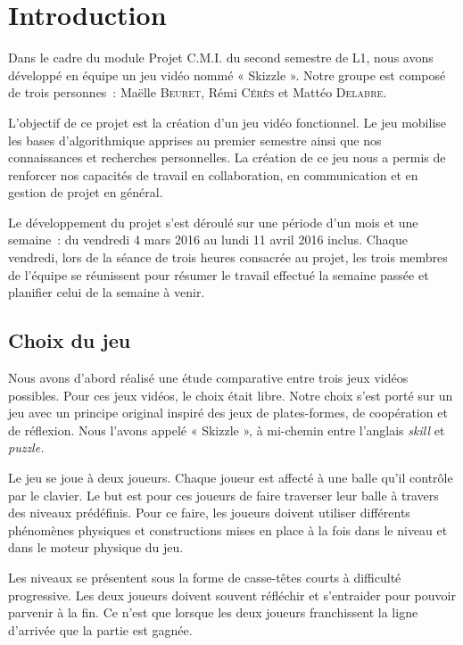 \chapter{Introduction}

Dans le cadre du module Projet C.M.I. du second semestre de L1,
nous avons développé en équipe un jeu vidéo nommé « Skizzle ».
Notre groupe est composé de trois personnes~: Maëlle \textsc{Beuret},
Rémi \textsc{Cérès} et Mattéo \textsc{Delabre}.

L'objectif de ce projet est la création d'un jeu vidéo fonctionnel.
Le jeu mobilise les bases d'algorithmique apprises au premier semestre ainsi
que nos connaissances et recherches personnelles. La création de ce jeu nous
a permis de renforcer nos capacités de travail en collaboration, en
communication et en gestion de projet en général.

Le développement du projet s'est déroulé sur une période d'un mois
et une semaine~: du vendredi 4 mars 2016 au lundi 11 avril 2016 inclus.
Chaque vendredi, lors de la séance de trois heures consacrée au projet,
les trois membres de l'équipe se réunissent pour résumer le travail effectué
la semaine passée et planifier celui de la semaine à venir.

\section{Choix du jeu}

Nous avons d'abord réalisé une étude comparative entre trois jeux
vidéos possibles. Pour ces jeux vidéos, le choix était libre. Notre choix
s'est porté sur un jeu avec un principe original inspiré des jeux de
plates-formes, de coopération et de réflexion. Nous l'avons appelé
« Skizzle », à mi-chemin entre l'anglais \emph{skill} et \emph{puzzle.}

Le jeu se joue à deux joueurs. Chaque joueur est affecté à une balle qu'il
contrôle par le clavier. Le but est pour ces joueurs de faire traverser leur
balle à travers des niveaux prédéfinis. Pour ce faire, les joueurs doivent
utiliser différents phénomènes physiques et constructions mises en place
à la fois dans le niveau et dans le moteur physique du jeu.

Les niveaux se présentent sous la forme de casse-têtes courts à difficulté
progressive. Les deux joueurs doivent souvent réfléchir et s'entraider
pour pouvoir parvenir à la fin. Ce n'est que lorsque les deux joueurs
franchissent la ligne d'arrivée que la partie est gagnée.

